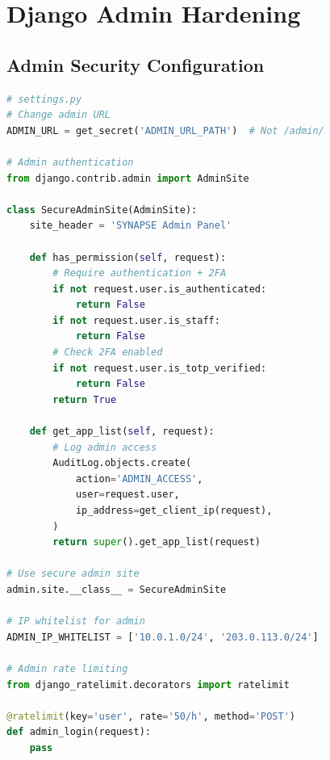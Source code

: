 \documentclass{report}
\begin{document}
\section{Django Admin Hardening}

\subsection{Admin Security Configuration}
\begin{lstlisting}[language=Python]
# settings.py
# Change admin URL
ADMIN_URL = get_secret('ADMIN_URL_PATH')  # Not /admin/

# Admin authentication
from django.contrib.admin import AdminSite

class SecureAdminSite(AdminSite):
    site_header = 'SYNAPSE Admin Panel'
    
    def has_permission(self, request):
        # Require authentication + 2FA
        if not request.user.is_authenticated:
            return False
        if not request.user.is_staff:
            return False
        # Check 2FA enabled
        if not request.user.is_totp_verified:
            return False
        return True
    
    def get_app_list(self, request):
        # Log admin access
        AuditLog.objects.create(
            action='ADMIN_ACCESS',
            user=request.user,
            ip_address=get_client_ip(request),
        )
        return super().get_app_list(request)

# Use secure admin site
admin.site.__class__ = SecureAdminSite

# IP whitelist for admin
ADMIN_IP_WHITELIST = ['10.0.1.0/24', '203.0.113.0/24']

# Admin rate limiting
from django_ratelimit.decorators import ratelimit

@ratelimit(key='user', rate='50/h', method='POST')
def admin_login(request):
    pass
\end{lstlisting}
\end{document}
